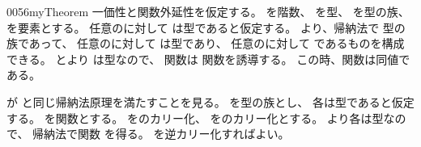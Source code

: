 \documentclass[index]{subfiles}
\begin{document}
\begin{myBlock}{0056}{myTheorem}
  一価性と関数外延性を仮定する。
  を階数、
  を型、
  を型の族、
  を要素とする。
  任意のに対して
  は型であると仮定する。
  より、帰納法で
  型の族であって、
  任意のに対して
  は型であり、
  任意のに対して
  であるものを構成できる。
  とより
  は型なので、
  関数は
  関数を誘導する。
  この時、関数は同値である。
\end{myBlock}
\begin{myProof}
  が
  と同じ帰納法原理を満たすことを見る。
  を型の族とし、
  各は型であると仮定する。
  を関数とする。
  をのカリー化、
  をのカリー化とする。
  より各は型なので、
  帰納法で関数
  を得る。
  を逆カリー化すればよい。
\end{myProof}
\end{document}
